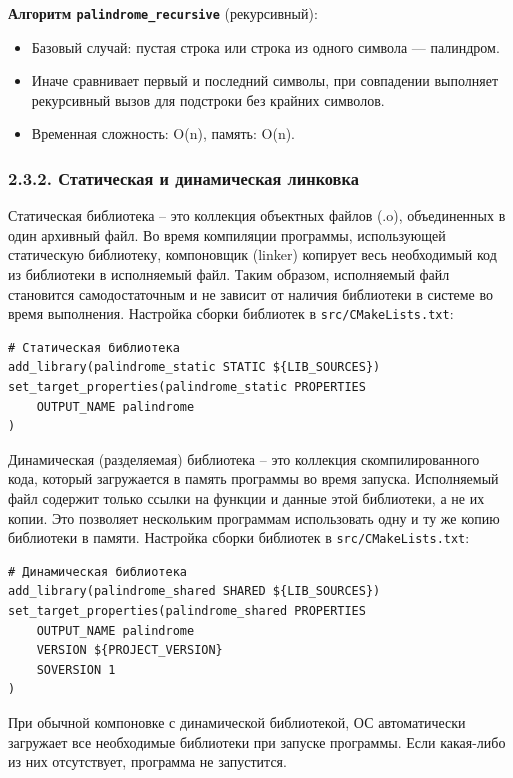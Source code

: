 \documentclass[14pt]{extreport}
\begin{document}
{\textbf{Алгоритм \texttt{palindrome\_recursive}} (рекурсивный):
\begin{itemize}
    \item Базовый случай: пустая строка или строка из одного символа — палиндром.
    \item Иначе сравнивает первый и последний символы, при совпадении выполняет рекурсивный вызов для подстроки без крайних символов.
    \item Временная сложность: O(n), память: O(n).
\end{itemize}

{\centering\subsubsection*{2.3.2. Статическая и динамическая линковка}}

Статическая библиотека -- это коллекция объектных файлов (.o), объединенных в один архивный файл. Во время компиляции программы, использующей статическую библиотеку, компоновщик (linker) копирует весь необходимый код из библиотеки в исполняемый файл. Таким образом, исполняемый файл становится самодостаточным и не зависит от наличия библиотеки в системе во время выполнения.
Настройка сборки библиотек в \texttt{src/CMakeLists.txt}:
\begin{verbatim}
# Статическая библиотека
add_library(palindrome_static STATIC ${LIB_SOURCES})
set_target_properties(palindrome_static PROPERTIES
    OUTPUT_NAME palindrome
)
\end{verbatim}

Динамическая (разделяемая) библиотека -- это коллекция скомпилированного кода, который загружается в память программы во время запуска. Исполняемый файл содержит только ссылки на функции и данные этой библиотеки, а не их копии. Это позволяет нескольким программам использовать одну и ту же копию библиотеки в памяти.
Настройка сборки библиотек в \texttt{src/CMakeLists.txt}:
\begin{verbatim}
# Динамическая библиотека
add_library(palindrome_shared SHARED ${LIB_SOURCES})
set_target_properties(palindrome_shared PROPERTIES
    OUTPUT_NAME palindrome
    VERSION ${PROJECT_VERSION}
    SOVERSION 1
)
\end{verbatim}

При обычной компоновке с динамической библиотекой, ОС автоматически загружает все необходимые библиотеки при запуске программы. Если какая-либо из них отсутствует, программа не запустится.

}
\end{document}
